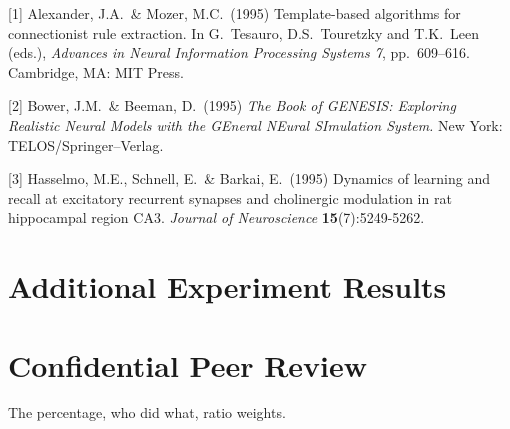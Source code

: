 \documentclass{article}
\begin{document}
{
\small


[1] Alexander, J.A.\ \& Mozer, M.C.\ (1995) Template-based algorithms for
connectionist rule extraction. In G.\ Tesauro, D.S.\ Touretzky and T.K.\ Leen
(eds.), {\it Advances in Neural Information Processing Systems 7},
pp.\ 609--616. Cambridge, MA: MIT Press.


[2] Bower, J.M.\ \& Beeman, D.\ (1995) {\it The Book of GENESIS: Exploring
  Realistic Neural Models with the GEneral NEural SImulation System.}  New York:
TELOS/Springer--Verlag.


[3] Hasselmo, M.E., Schnell, E.\ \& Barkai, E.\ (1995) Dynamics of learning and
recall at excitatory recurrent synapses and cholinergic modulation in rat
hippocampal region CA3. {\it Journal of Neuroscience} {\bf 15}(7):5249-5262.
}

\section*{Additional Experiment Results}

\section*{Confidential Peer Review} 

The percentage, who did what, ratio weights. 
\end{document}
